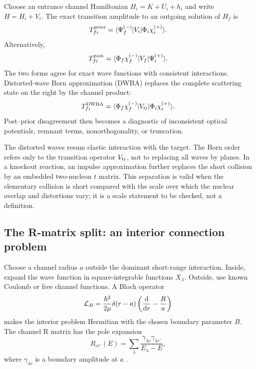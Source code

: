 Choose an entrance channel Hamiltonian $H_i=K+U_i+h_i$ and write
$H=H_i+V_i$.  The exact transition amplitude to an outgoing solution of
$H_f$ is
\begin{equation}
  T_{fi}^{\mathrm{prior}}
  =\langle \Psi_f^{(-)} \rvert V_i\lvert \Phi_i\chi_i^{(+)} \rangle.
  \label{eq:exact-prior-amplitude}
\end{equation}
Alternatively,
\begin{equation}
  T_{fi}^{\mathrm{post}}
  =\langle \Phi_f\chi_f^{(-)} \rvert V_f\lvert \Psi_i^{(+)} \rangle.
  \label{eq:exact-post-amplitude}
\end{equation}
The two forms agree for exact wave functions with consistent interactions.
Distorted-wave Born approximation (DWBA) replaces the complete scattering
state on the right by the channel product:
\begin{equation}
  T_{fi}^{\mathrm{DWBA}}
  =\langle \Phi_f\chi_f^{(-)} \rvert V_{\mathrm{tr}}\lvert \Phi_i\chi_i^{(+)} \rangle.
  \label{eq:dwba-amplitude}
\end{equation}
Post--prior disagreement then becomes a diagnostic of inconsistent optical
potentials, remnant terms, nonorthogonality, or truncation.

The distorted waves resum elastic interaction with the target.  The Born
order refers only to the transition operator $V_{\mathrm{tr}}$, not to replacing
all waves by planes.  In a knockout reaction, an impulse approximation further
replaces the short collision by an embedded two-nucleon $t$ matrix.  This
separation is valid when the elementary collision is short compared with the
scale over which the nuclear overlap and distortions vary; it is a scale
statement to be checked, not a definition.

\subsection{The R-matrix split: an interior connection problem}
\label{subsec:r-matrix-foundations}

Choose a channel radius $a$ outside the dominant short-range interaction.
Inside, expand the wave function in square-integrable functions $X_\lambda$.
Outside, use known Coulomb or free channel functions.  A Bloch operator
\begin{equation}
  \mathcal L_B=
  \frac{\hbar^2}{2\mu}\delta(r-a)
  \left(\frac{\mathrm{d}}{\mathrm{d} r}-\frac{B}{a}\right)
  \label{eq:bloch-operator}
\end{equation}
makes the interior problem Hermitian with the chosen boundary parameter $B$.
The channel R matrix has the pole expansion
\begin{equation}
  R_{cc'}(E)
  =\sum_\lambda
  \frac{\gamma_{\lambda c}\gamma_{\lambda c'}}
       {E_\lambda-E},
  \label{eq:r-matrix-pole-expansion}
\end{equation}
where $\gamma_{\lambda c}$ is a boundary amplitude at $a$
\cite{LaneThomas1958RMatrix}.

